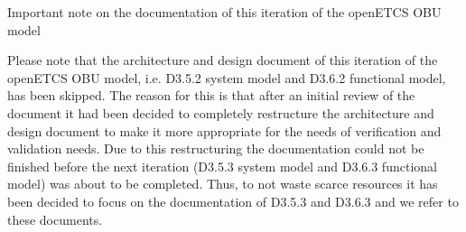 \documentclass{template/openetcs_report}
\begin{document}
\mainmatter

{\huge Important note on the documentation of this iteration of the openETCS OBU model}


Please note that the architecture and design document of this iteration of the openETCS OBU model, i.e. D3.5.2 system model and D3.6.2 functional model, has been skipped. The reason for this is that after an initial review of the document it had been decided to completely restructure the architecture and design document  to make it more appropriate for the needs of verification and validation needs. Due to this restructuring the documentation could not be finished before the next iteration (D3.5.3 system model and D3.6.3 functional model) was about to be completed. Thus, to not waste scarce resources it has been decided to focus on the documentation of D3.5.3 and D3.6.3 and we refer to these documents.


\end{document}
